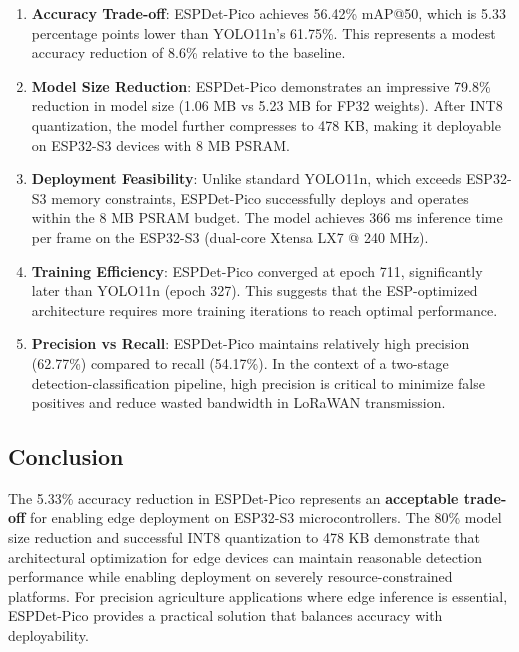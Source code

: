 \documentclass[12pt,a4paper]{article}
\begin{document}
\begin{enumerate}
    \item \textbf{Accuracy Trade-off}: ESPDet-Pico achieves 56.42\% mAP@50, which is 5.33 percentage points lower than YOLO11n's 61.75\%. This represents a modest accuracy reduction of 8.6\% relative to the baseline.
    
    \item \textbf{Model Size Reduction}: ESPDet-Pico demonstrates an impressive 79.8\% reduction in model size (1.06 MB vs 5.23 MB for FP32 weights). After INT8 quantization, the model further compresses to 478 KB, making it deployable on ESP32-S3 devices with 8 MB PSRAM.
    
    \item \textbf{Deployment Feasibility}: Unlike standard YOLO11n, which exceeds ESP32-S3 memory constraints, ESPDet-Pico successfully deploys and operates within the 8 MB PSRAM budget. The model achieves 366 ms inference time per frame on the ESP32-S3 (dual-core Xtensa LX7 @ 240 MHz).
    
    \item \textbf{Training Efficiency}: ESPDet-Pico converged at epoch 711, significantly later than YOLO11n (epoch 327). This suggests that the ESP-optimized architecture requires more training iterations to reach optimal performance.
    
    \item \textbf{Precision vs Recall}: ESPDet-Pico maintains relatively high precision (62.77\%) compared to recall (54.17\%). In the context of a two-stage detection-classification pipeline, high precision is critical to minimize false positives and reduce wasted bandwidth in LoRaWAN transmission.
\end{enumerate}

\subsection*{Conclusion}

The 5.33\% accuracy reduction in ESPDet-Pico represents an \textbf{acceptable trade-off} for enabling edge deployment on ESP32-S3 microcontrollers. The 80\% model size reduction and successful INT8 quantization to 478 KB demonstrate that architectural optimization for edge devices can maintain reasonable detection performance while enabling deployment on severely resource-constrained platforms. For precision agriculture applications where edge inference is essential, ESPDet-Pico provides a practical solution that balances accuracy with deployability.
\end{document}
